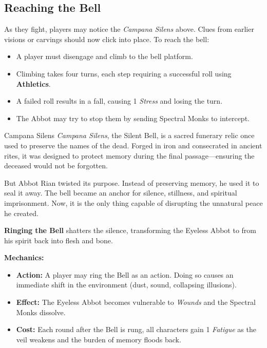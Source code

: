 \documentclass[twocolumn,nodeprecatedcode,bg=print]{dndbook/dndbook}
\begin{document}
\subsection*{Reaching the Bell}

As they fight, players may notice the \emph{Campana Silens} above. Clues from earlier visions or carvings should now click into place. To reach the bell:

\begin{WyrdExample}
    \begin{itemize}
    \item A player must disengage and climb to the bell platform.
    \item Climbing takes four turns, each step requiring a successful \Challenging roll using \textbf{Athletics}.
    \item A failed roll results in a fall, causing 1 \emph{Stress} and losing the turn.
    \item The Abbot may try to stop them by sending Spectral Monks to intercept.
    \end{itemize}
\end{WyrdExample}

\begin{WyrdSidebar}[float=!b]{Campana Silens}
    \emph{Campana Silens}, the Silent Bell, is a sacred funerary relic once used to preserve the names of the dead. Forged in iron and consecrated in ancient rites, it was designed to protect memory during the final passage—ensuring the deceased would not be forgotten.
    
    But Abbot Rian twisted its purpose. Instead of preserving memory, he used it to seal it away. The bell became an anchor for silence, stillness, and spiritual imprisonment. Now, it is the only thing capable of disrupting the unnatural peace he created.
    
    \vspace{0.5\baselineskip}\noindent
    \textbf{Ringing the Bell} shatters the silence, transforming the Eyeless Abbot to from his spirit back into flesh and bone.
    
    \vspace{0.5\baselineskip}
    \textbf{Mechanics:}
    \begin{itemize}
        \item \textbf{Action:} A player may ring the Bell as an action. Doing so causes an immediate shift in the environment (dust, sound, collapsing illusions).
        \item \textbf{Effect:} The Eyeless Abbot becomes vulnerable to \emph{Wounds} and the Spectral Monks dissolve.
        \item \textbf{Cost:} Each round after the Bell is rung, all characters gain 1 \emph{Fatigue} as the veil weakens and the burden of memory floods back.
    \end{itemize}
\end{WyrdSidebar}
\end{document}
